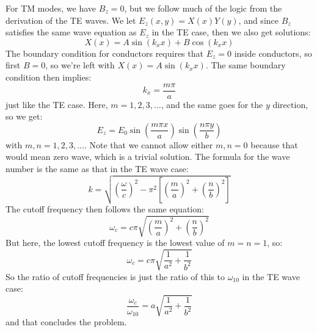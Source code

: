 \documentclass[10pt]{article}
\begin{document}
	\begin{solution}
		For TM modes, we have \( B_z = 0 \), but we follow much of the logic from the derivation of the TE
		waves. We let \( E_z(x, y) = X(x) Y(y) \), and since \( B_z \) satisfies the same wave equation as \(
		E_z\) in the TE case, then we also get solutions:
		\[
			X(x) = A \sin(k_x x) + B \cos(k_x x)
		\]
		The boundary condition for conductors requires that \( E_z = 0 \) inside conductors, so first \( B =
		0 \), so we're left with \( X(x) = A \sin(k_x x) \). The same boundary condition then implies:
		\[
			k_x = \frac{m \pi}{a}
		\]
		just like the TE case. Here, \( m = 1, 2, 3, \dots \), and the same goes for the \( y \) direction, so we
		get:
		\[
			E_z = E_0 \sin\left( \frac{m\pi x}{a} \right)\sin(\frac{n \pi y}{b})
		\]
		with \( m, n = 1, 2, 3, \dots \). Note that we cannot allow either \( m, n = 0 \) because that would
		mean zero wave, which is a trivial solution. The formula for the wave number is the same as that in the TE
		wave case:
		\[
			k = \sqrt{\left( \frac{\omega}{c} \right)^2 - \pi^2 \left[ \left( \frac{m}{a} \right)^2 + \left(
			\frac{n}{b}\right)^2 \right]}
		\]
		The cutoff frequency then follows the same equation:
		\[
			\omega_c = c \pi \sqrt{\left( \frac{m}{a} \right)^2 + \left( \frac{n}{b} \right)^2}
		\]
		But here, the lowest cutoff frequency is the lowest value of \( m = n = 1 \), so:
		\[
			\omega_c = c \pi \sqrt{\frac{1}{a^2} + \frac{1}{b^2}}
		\]
		So the ratio of cutoff frequencies is just the ratio of this to \( \omega_{10} \) in the TE wave
		case:
		\[
			\frac{\omega_c}{\omega_{10}} = a\sqrt{\frac{1}{a^2} + \frac{1}{b^2}}
		\]
		and that concludes the problem. 
	\end{solution}
\end{document}
